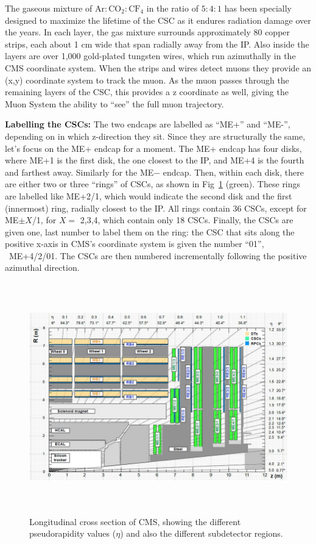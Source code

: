 The gaseous mixture of $\mathrm{Ar:CO_{2}:CF_{4}}$ in the ratio of $5:4:1$ has been specially designed to maximize the lifetime of the CSC as it endures radiation damage over the years. 
In each layer, the gas mixture surrounds approximately 80 copper strips, each about 1 cm wide that span radially away from the IP.
Also inside the layers are over 1,000 gold-plated tungsten wires, which run azimuthally in the CMS coordinate system.
When the strips and wires detect muons they provide an (x,y) coordinate system to track the muon. 
As the muon passes through the remaining layers of the CSC, this provides a z coordinate as well, giving the Muon System the ability to ``see'' the full muon trajectory.

\textbf{Labelling the CSCs:} 
The two endcaps are labelled as ``ME+'' and ``ME-'', depending on in which z-direction they sit. 
Since they are structurally the same, let's focus on the ME+ endcap for a moment. 
The ME+ endcap has four disks, where ME+1 is the first disk, the one closest to the IP, and ME+4 is the fourth and farthest away. 
Similarly for the ME$-$ endcap. 
Then, within each disk, there are either two or three ``rings'' of CSCs, as shown in Fig~\ref{fig:cms_long_view_subdetectors} (green).
These rings are labelled like ME+2/1, which would indicate the second disk and the first (innermost) ring, radially closest to the IP.
All rings contain 36 CSCs, except for ME$\pm X$/1, for $X=$ 2,3,4, which contain only 18 CSCs.
Finally, the CSCs are given one, last number to label them on the ring:
the CSC that sits along the positive x-axis in CMS's coordinate system is given the number ``01'', \eg\ ME+4/2/01. 
The CSCs are then numbered incrementally following the positive azimuthal direction.
\begin{figure}[pbth]
\centering
\includegraphics[width=15cm,height=10cm,keepaspectratio]{figures/cms/cms_longitudinal_view.png}
    \caption{
    Longitudinal cross section of CMS, showing the different pseudorapidity values ($\eta$) and also the different subdetector regions.
    }
    \label{fig:cms_long_view_subdetectors}
\end{figure}

